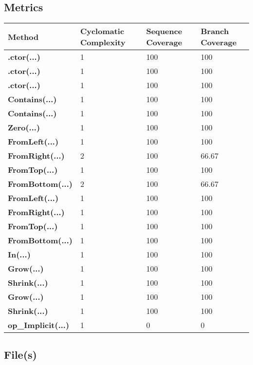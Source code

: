 \documentclass[a4paper,10pt]{article}
\begin{document}
\subsection{Metrics}
\begin{longtable}[l]{|l|l|l|l|}
\hline
\textbf{Method} & \textbf{Cyclomatic Complexity} & \textbf{Sequence Coverage} & \textbf{Branch Coverage}\\
\hline
\textbf{.ctor(...)} & 1 & 100 & 100\\
\hline
\textbf{.ctor(...)} & 1 & 100 & 100\\
\hline
\textbf{.ctor(...)} & 1 & 100 & 100\\
\hline
\textbf{Contains(...)} & 1 & 100 & 100\\
\hline
\textbf{Contains(...)} & 1 & 100 & 100\\
\hline
\textbf{Zero(...)} & 1 & 100 & 100\\
\hline
\textbf{FromLeft(...)} & 1 & 100 & 100\\
\hline
\textbf{FromRight(...)} & 2 & 100 & 66.67\\
\hline
\textbf{FromTop(...)} & 1 & 100 & 100\\
\hline
\textbf{FromBottom(...)} & 2 & 100 & 66.67\\
\hline
\textbf{FromLeft(...)} & 1 & 100 & 100\\
\hline
\textbf{FromRight(...)} & 1 & 100 & 100\\
\hline
\textbf{FromTop(...)} & 1 & 100 & 100\\
\hline
\textbf{FromBottom(...)} & 1 & 100 & 100\\
\hline
\textbf{In(...)} & 1 & 100 & 100\\
\hline
\textbf{Grow(...)} & 1 & 100 & 100\\
\hline
\textbf{Shrink(...)} & 1 & 100 & 100\\
\hline
\textbf{Grow(...)} & 1 & 100 & 100\\
\hline
\textbf{Shrink(...)} & 1 & 100 & 100\\
\hline
\textbf{op\_Implicit(...)} & 1 & 0 & 0\\
\hline
\end{longtable}
\subsection{File(s)}
\end{document}
